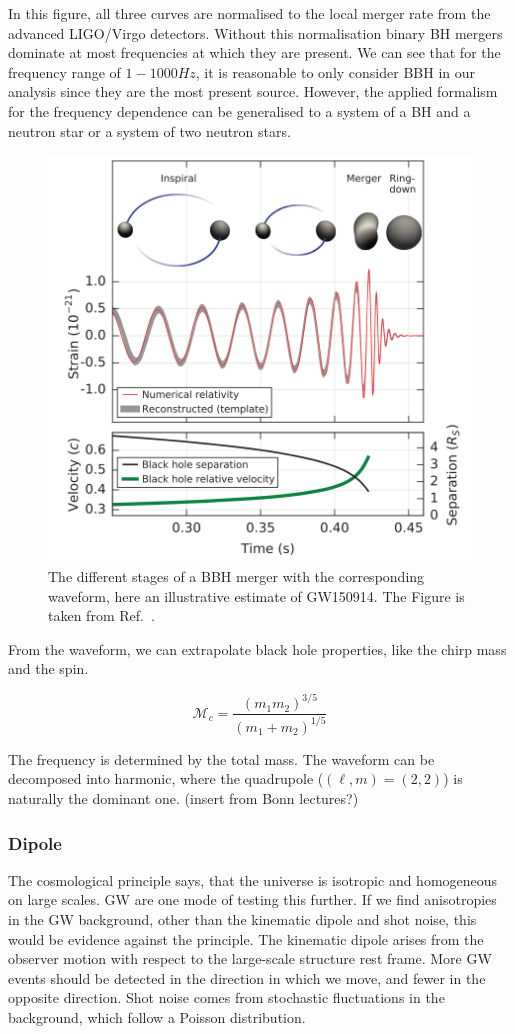 In this figure, all three curves are normalised to the local merger rate from the advanced LIGO/Virgo detectors. Without this normalisation binary BH mergers dominate at most frequencies at which they are present. We can see that for the frequency range of $1-1000 Hz$, it is reasonable to only consider BBH in our analysis since they are the most present source. However, the applied formalism for the frequency dependence can be generalised to a system of a BH and a neutron star or a system of two neutron stars.

\begin{figure}[h]
    \centering
    \includegraphics[width=0.7\linewidth]{Images/waveform_abbott_complete.png}
    \caption{The different stages of a BBH merger with the corresponding waveform, here an illustrative estimate of GW150914. The Figure is taken from Ref.\ \cite{abbott_observation_2016}.}
    \label{GW_waveform}
\end{figure} 

From the waveform, we can extrapolate black hole properties, like the chirp mass and the spin. 

\begin{equation}
    \mathcal{M}_c = \frac{(m_1m_2)^{3/5}}{(m_1+m_2)^{1/5}}
\end{equation}

The frequency is determined by the total mass. 
The waveform can be decomposed into harmonic, where the quadrupole ($(\ell, m)=(2,2)$) is naturally the dominant one. 
(insert from Bonn lectures?)


\subsubsection{Dipole}
The cosmological principle says, that the universe is isotropic and homogeneous on large scales. GW are one mode of testing this further. If we find anisotropies in the GW background, other than the kinematic dipole and shot noise, this would be evidence against the principle.
The kinematic dipole arises from the observer motion with respect to the large-scale structure rest frame. More GW events should be detected in the direction in which we move, and fewer in the opposite direction. Shot noise comes from stochastic fluctuations in the background, which follow a Poisson distribution.

